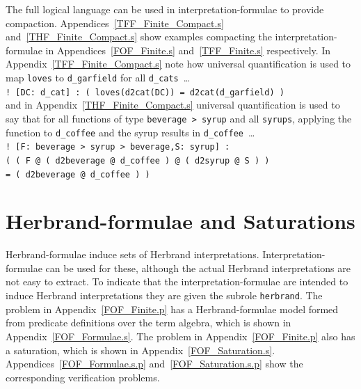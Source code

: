 \documentclass{easychair}
\newcommand{\smalltt}[1]{\small \texttt{#1}}
\begin{document}
The full logical language can be used in interpretation-formulae to provide compaction.
Appendices~\ref{TFF_Finite_Compact.s} and~\ref{THF_Finite_Compact.s} show examples compacting the
interpretation-formulae in Appendices~\ref{FOF_Finite.s} and~\ref{TFF_Finite.s} respectively.
In Appendix~\ref{TFF_Finite_Compact.s} note how universal quantification is used to map
{\tt loves} to {\tt d\_garfield} for all {\tt d\_cats}~\ldots \\
\hspace*{0.5cm}\smalltt{! [DC: d\_cat] : ( loves(d2cat(DC)) = d2cat(d\_garfield) )} \\
and in Appendix~\ref{THF_Finite_Compact.s} universal quantification is used to say that for all
functions of type {\tt beverage > syrup} and all {\tt syrups}, applying the function to
{\tt d\_coffee} and the syrup results in {\tt d\_coffee}~\ldots \\
\hspace*{0.5cm}\smalltt{! [F: beverage > syrup > beverage,S: syrup] :} \\
\hspace*{0.8cm}\smalltt{( ( F @ ( d2beverage @ d\_coffee ) @ ( d2syrup @ S ) )} \\
\hspace*{0.8cm}\smalltt{= ( d2beverage @ d\_coffee ) )}

\section{Herbrand-formulae and Saturations}
\label{NewHerbrand}

Herbrand-formulae induce sets of Herbrand interpretations.
Interpretation-formulae can be used for these, although the actual Herbrand interpretations are
not easy to extract.
To indicate that the interpretation-formulae are intended to induce Herbrand interpretations they
are given the subrole {\tt herbrand}.
The problem in Appendix~\ref{FOF_Finite.p} has a Herbrand-formulae model formed from predicate 
definitions over the term algebra, which is shown in Appendix~\ref{FOF_Formulae.s}.
The problem in Appendix~\ref{FOF_Finite.p} also has a saturation, which is shown in
Appendix~\ref{FOF_Saturation.s}.
Appendices~\ref{FOF_Formulae.s.p} and~\ref{FOF_Saturation.s.p} show the corresponding verification 
problems.

\end{document}
